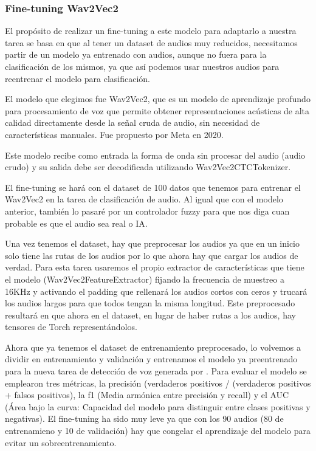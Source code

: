 \subsubsection{Fine-tuning Wav2Vec2}

El propósito de realizar un fine-tuning a este modelo para adaptarlo a nuestra tarea se basa en que al tener un dataset de audios muy reducidos, necesitamos partir de un modelo ya entrenado con audios, aunque no fuera para la clasificación de los mismos, ya que así podemos usar nuestros audios para reentrenar el modelo para clasificación.

El modelo que elegimos fue Wav2Vec2, que es un modelo de aprendizaje profundo para procesamiento de voz que permite obtener representaciones acústicas de alta calidad directamente desde la señal cruda de audio, sin necesidad de características manuales. Fue propuesto por Meta en 2020.

Este modelo recibe como entrada la forma de onda sin procesar del audio (audio crudo) y su salida debe ser decodificada utilizando Wav2Vec2CTCTokenizer.

El fine-tuning se hará con el dataset de 100 datos que tenemos para entrenar el Wav2Vec2 en la tarea de clasificación de audio. Al igual que con el modelo anterior, también lo pasaré por un controlador fuzzy para que nos diga cuan probable es que el audio sea real o IA.

Una vez tenemos el dataset, hay que preprocesar los audios ya que en un inicio solo tiene las rutas de los audios por lo que ahora hay que cargar los audios de verdad. Para esta tarea usaremos el propio extractor de características que tiene el modelo (Wav2Vec2FeatureExtractor) fijando la frecuencia de muestreo a 16KHz y activando el padding que rellenará los audios cortos con ceros y trucará los audios largos para que todos tengan la misma longitud. Este preprocesado resultará en que ahora en el dataset, en lugar de haber rutas a los audios, hay tensores de Torch representándolos.

Ahora que ya tenemos el dataset de entrenamiento preprocesado, lo volvemos a dividir en entrenamiento y validación y entrenamos el modelo ya preentrenado para la nueva tarea de detección de voz generada por . Para evaluar el modelo se emplearon tres métricas, la precisión (verdaderos positivos / (verdaderos positivos + falsos positivos), la f1 (Media armónica entre precisión y recall) y el AUC (Área bajo la curva: Capacidad del modelo para distinguir entre clases positivas y negativas). El fine-tuning ha sido muy leve ya que con los 90 audios (80 de entrenamieno y 10 de validación) hay que congelar el aprendizaje del modelo para evitar un sobreentrenamiento.

